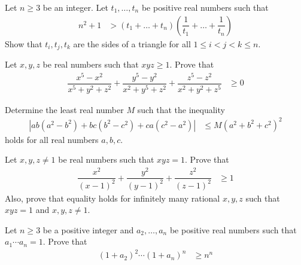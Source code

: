 \documentclass{subfile}
\begin{document}
		\begin{problem}
			Let $n\geq3$ be an integer. Let $t_{1},\ldots,t_{n}$ be positive real numbers such that
				\begin{align*}
					n^{2}+1
						& > (t_{1}+\ldots+t_{n})\left(\dfrac{1}{t_{1}}+\ldots+\dfrac{1}{t_{n}}\right)
				\end{align*}
			Show that $t_{i},t_{j},t_{k}$ are the sides of a triangle for all $1\leq i< j < k\leq n$.
		\end{problem}
	
		\begin{problem}
			Let $x,y,z$ be real numbers such that $xyz\geq1$. Prove that
				\begin{align*}
					\dfrac{x^{5}-x^{2}}{x^{5}+y^{2}+z^{2}}+\dfrac{y^{5}-y^{2}}{x^{2}+y^{5}+z^{2}}+\dfrac{z^{5}-z^{2}}{x^{2}+y^{2}+z^{5}}
						& \geq0
				\end{align*}
		\end{problem}
		
		\begin{problem}
			Determine the least real number $M$ such that the inequality
				\begin{align*}
					\left|ab\left(a^{2}-b^{2}\right)+bc\left(b^{2}-c^{2}\right)+ca\left(c^{2}-a^{2}\right)\right|
						& \leq M(a^{2}+b^{2}+c^{2})^{2}
				\end{align*}
			holds for all real numbers $a,b,c$.
		\end{problem}
	
		\begin{problem}
			Let $x,y,z\neq1$ be real numbers such that $xyz=1$. Prove that
				\begin{align*}
					\dfrac{x^{2}}{(x-1)^{2}}+\dfrac{y^{2}}{(y-1)^{2}}+\dfrac{z^{2}}{(z-1)^{2}}
						& \geq1
				\end{align*}
			Also, prove that equality holds for infinitely many rational $x,y,z$ such that $xyz=1$ and $x,y,z\neq1$.
		\end{problem}
	
		\begin{problem}
			Let $n\geq3$ be a positive integer and $a_2,\ldots,a_n$ be positive real numbers such that $a_1\cdots a_n=1$. Prove that
				\begin{align*}
					(1+a_2)^{2}\cdots(1+a_n)^{n}
						& \geq n^{n}
				\end{align*}
		\end{problem}
	
\end{document}

